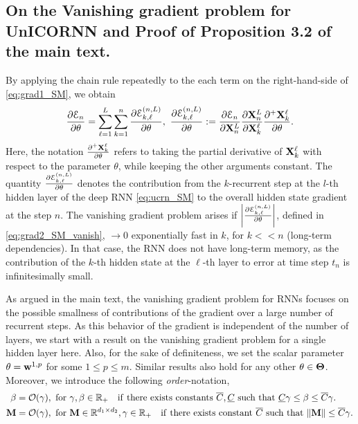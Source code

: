 \documentclass{article}
\newcommand{\bw}{{\bf w}}
\newcommand{\bX}{{\bf X}}
\newcommand{\ord}{{\mathcal O}}
\newcommand{\R}{{\mathbb R}}
\newcommand{\E}{\EuScript{E}}
\begin{document}
\subsection{On the Vanishing gradient problem for UnICORNN and Proof of Proposition 3.2 of the main text.}
By applying the chain rule repeatedly to the each term on the right-hand-side of \eqref{eq:grad1_SM}, we obtain 
\begin{equation}
\label{eq:grad2_SM_vanish}
\frac{\partial \E_n}{\partial \theta} =\sum\limits_{\ell=1}^L\sum\limits_{k=1}^n \frac{\partial \E^{(n,L)}_{k,\ell}}{\partial \theta},~\frac{\partial \E^{(n,L)}_{k,\ell}}{\partial \theta}:= \frac{\partial \E_n}{\partial \bX^L_n} \frac{\partial \bX^L_n}{\partial \bX^\ell_k} \frac{\partial^{+} \bX^\ell_k}{\partial \theta}. \end{equation}
Here, the notation $\frac{\partial^{+} \bX^\ell_k}{\partial \theta}$ refers to taking the partial derivative of $\bX^\ell_k$ with respect to the parameter $\theta$, while keeping the other arguments constant.  The quantity $\frac{\partial \E^{(n,L)}_{k,\ell}}{\partial \theta}$ denotes the contribution from the $k$-recurrent step at the $l$-th hidden layer of the deep RNN \eqref{eq:ucrn_SM} to the overall hidden state gradient at the step $n$. The vanishing gradient problem \citep{vanish_grad} arises if $\left | \frac{\partial \E^{(n,L)}_{k,\ell}}{\partial \theta} \right |$, defined in \eqref{eq:grad2_SM_vanish}, $\rightarrow 0$ exponentially fast in $k$, for $k << n$ (long-term dependencies). In that case, the RNN does not have long-term memory, as the contribution of the $k$-th hidden state at the $\ell$-th layer to error at time step $t_n$ is infinitesimally small. 

As argued in the main text, the vanishing gradient problem for RNNs focuses on the possible smallness of contributions of the gradient over a large number of recurrent steps. As this behavior of the gradient is independent of the number of layers, we start with a result on the vanishing gradient problem for a single hidden layer here. Also, for the sake of definiteness, we set the scalar parameter $\theta = \bw^{1,p}$ for some $1 \leq p \leq m$. Similar results also hold for any other $\theta \in {\bf \Theta}$. Moreover, we introduce the following \emph{order}-notation,
\begin{equation}
    \label{eq:ord}
    \begin{aligned}
   {\bf \beta} &= \ord(\gamma), \ {\rm for}~\gamma,\beta \in \R_+ \quad {\rm if~there~exists~constants}~ \overline{C},\underline{C}~{\rm such~that}~\underline{C} \gamma \leq \beta \leq \overline{C} \gamma. \\
   {\bf M} &= \ord(\gamma), \ {\rm for}~{\bf M} \in \R^{d_1 \times d_2}, \gamma \in \R_+ \quad {\rm if~there~exists~constant}~ \overline{C}~{\rm such~that}~\|{\bf M}\| \leq \overline{C} \gamma.
   \end{aligned}
\end{equation}
\end{document}
